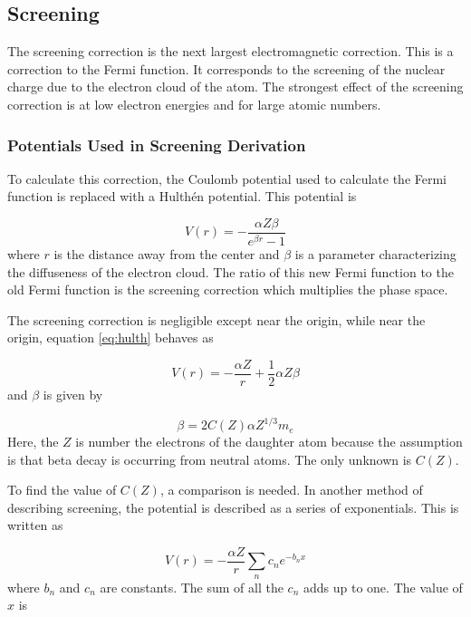 \documentclass[../MaxHughesThesis.tex]{subfiles}
\begin{document}
\subsection{Screening}
The screening correction is the next largest electromagnetic correction.
This is a correction to the Fermi function.
It corresponds to the screening of the nuclear charge due to the electron cloud of the atom.
The strongest effect of the screening correction is at low electron energies and for large atomic numbers.

\subsubsection{Potentials Used in Screening Derivation}
To calculate this correction, the Coulomb potential used to calculate the Fermi function is replaced with a Hulth\'en potential.
This potential is %

\begin{equation}
	V(r) = -\frac{\alpha Z \beta}{e^{\beta r} - 1}
	\label{eq:hulth}
\end{equation}
where $r$ is the distance away from the center and $\beta$ is a parameter characterizing the diffuseness of the electron cloud.
The ratio of this new Fermi function to the old Fermi function is the screening correction which multiplies the phase space. 

The screening correction is negligible except near the origin, while near the origin, equation \ref{eq:hulth} behaves as %

\begin{equation}
	V(r) = -\frac{\alpha Z}{r} + \frac{1}{2}\alpha Z \beta
	\label{eq:hulthorg}
\end{equation}
and $\beta$ is given by \cite{Buh84} %
	
\begin{equation}
	\beta = 2C(Z)\alpha Z^{1/3} m_{e}
	\label{eq:screenbeta}
\end{equation}
Here, the $Z$ is number the electrons of the daughter atom because the assumption is that beta decay is occurring from neutral atoms.
The only unknown is $C(Z)$.

To find the value of $C(Z)$, a comparison is needed. 
In another method of describing screening, the potential is described as a series of exponentials.
This is written as \cite{Bya56} %

\begin{equation}
	V(r) = -\frac{\alpha Z}{r}\sum_{n}c_{n}e^{-b_{n} x}
	\label{eq:hart}
\end{equation}
where $b_{n}$ and $c_{n}$ are constants.
The sum of all the $c_{n}$ adds up to one.
The value of $x$ is \cite{Bya56} %
\end{document}
